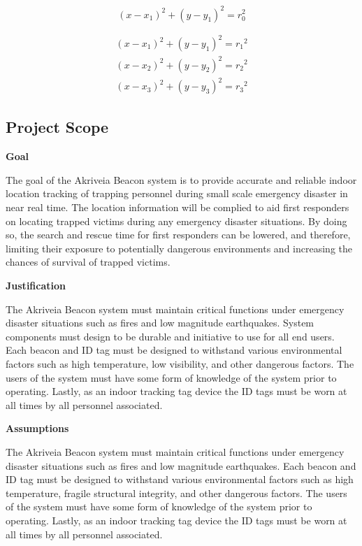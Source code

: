 \medskip
\begin{equation}
	(x-x_{1})^2 + (y-y_{1})^2 = r_{0}^2
\end{equation}

\begin{gather}
	(x-x_1)^2 + (y-y_1)^2 = {r_1}^2 \\
	\nonumber (x-x_2)^2 + (y-y_2)^2 = {r_2}^2 \\
	\nonumber (x-x_3)^2 + (y-y_3)^2 = {r_3}^2  
\end{gather}


\pagebreak
\subsection{Project Scope}

\medskip
\textbf{Goal}

\medskip
The goal of the Akriveia Beacon system is to provide accurate and reliable indoor location tracking of trapping personnel during small scale emergency disaster in near real time. The location information will be complied to aid first responders on locating trapped victims during any emergency disaster situations. By doing so, the search and rescue time for first responders can be lowered, and therefore, limiting their exposure to potentially dangerous environments and increasing the chances of survival of trapped victims.

\bigskip
\textbf{Justification}

\medskip
The Akriveia Beacon system must maintain critical functions under emergency disaster situations such as fires and low magnitude earthquakes. System components must design to be durable and initiative to use for all end users. Each beacon and ID tag must be designed to withstand various environmental factors such as high temperature, low visibility, and other dangerous factors. The users of the system must have some form of knowledge of the system prior to operating. Lastly, as an indoor tracking tag device the ID tags must be worn at all times by all personnel associated.

\bigskip
\textbf{Assumptions}

\medskip
The Akriveia Beacon system must maintain critical functions under emergency disaster situations such as fires and low magnitude earthquakes. Each beacon and ID tag must be designed to withstand various environmental factors such as high temperature, fragile structural integrity, and other dangerous factors. The users of the system must have some form of knowledge of the system prior to operating. Lastly, as an indoor tracking tag device the ID tags must be worn at all times by all personnel associated.

